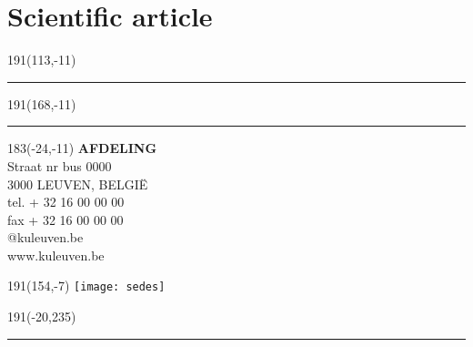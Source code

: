 \documentclass[12pt,a4paper,oneside]{book}
\begin{document}

\clearpage
{}
\appendix







\chapter{Scientific article}



\newpage
\thispagestyle{empty}
\sffamily
%
\begin{textblock}{191}(113,-11)
{\color{blueline}\rule{160pt}{5.5pt}}
\end{textblock}
%
\begin{textblock}{191}(168,-11)
{\color{blueline}\rule{5.5pt}{59pt}}
\end{textblock}
%
\begin{textblock}{183}(-24,-11)
\textblockcolour{}
\flushright
\fontsize{7}{7.5}\selectfont
\textbf{AFDELING}\\
Straat nr bus 0000\\
3000 LEUVEN, BELGI\"{E}\\
tel. + 32 16 00 00 00\\
fax + 32 16 00 00 00\\
@kuleuven.be\\
www.kuleuven.be\\
\end{textblock}
%
\begin{textblock}{191}(154,-7)
\textblockcolour{}
\texttt{[image: sedes]}
\end{textblock}
%
\begin{textblock}{191}(-20,235)
{\color{bluetitle}\rule{544pt}{55pt}}
\end{textblock}
\end{document}
